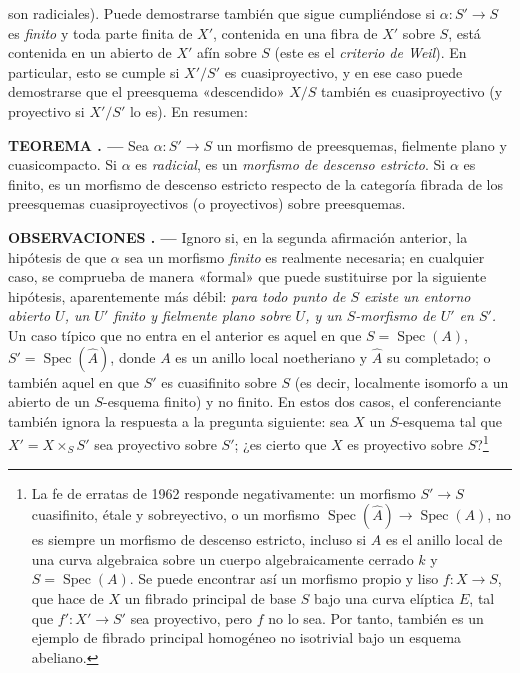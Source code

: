 \documentclass[11pt,twoside,openany]{book}
\numberwithin{equation}{section}
\newcommand{\src}[1]{%
  \phantomsection\hypertarget{src:#1}{}%
  \marginpar{\raggedleft\footnotesize\sffamily #1}%
}
\theoremstyle{plain}
\theoremstyle{definition}
\theoremstyle{remark}
\newcommand{\result}[2]{%
  \par\medskip\noindent\textbf{#1%
  \if\relax\detokenize{#2}\relax\else\space#2\fi. ---}\enspace
}
\newcommand{\FgaUnitKey}{frontmatter}
\renewcommand{\src}[1]{%
  \phantomsection\hypertarget{src:\FgaUnitKey:#1}{}%
  \marginpar{\raggedleft\footnotesize\sffamily #1}%
}
\theoremstyle{plain}
\theoremstyle{definition}
\theoremstyle{remark}
\begin{document}
\src{318}
son radiciales). Puede demostrarse también que sigue cumpliéndose si
$\alpha:S'\longrightarrow S$ es \emph{finito} y toda parte finita de $X'$,
contenida en una fibra de $X'$ sobre $S$, está contenida en un abierto de $X'$
afín sobre $S$ (este es el \emph{criterio de Weil}). En particular, esto se
cumple si $X'/S'$ es cuasiproyectivo, y en ese caso puede demostrarse que el
preesquema «descendido» $X/S$ también es cuasiproyectivo (y proyectivo si
$X'/S'$ lo es). En resumen:

\result{TEOREMA}{3} Sea $\alpha:S'\longrightarrow S$ un morfismo de
preesquemas, fielmente plano y cuasicompacto. Si $\alpha$ es \emph{radicial},
es un \emph{morfismo de descenso estricto}. Si $\alpha$ es finito, es un
morfismo de descenso estricto respecto de la categoría fibrada de los
preesquemas cuasiproyectivos (o proyectivos) sobre preesquemas.

\result{OBSERVACIONES}{} Ignoro si, en la segunda afirmación anterior, la
hipótesis de que $\alpha$ sea un morfismo \emph{finito} es realmente necesaria;
en cualquier caso, se comprueba de manera «formal» que puede sustituirse por la
siguiente hipótesis, aparentemente más débil: \emph{para todo punto de $S$
existe un entorno abierto $U$, un $U'$ finito y fielmente plano sobre $U$, y un
$S$-morfismo de $U'$ en $S'$.} Un caso típico que no entra en el anterior es
aquel en que $S=\operatorname{Spec}(A)$,
$S'=\operatorname{Spec}(\widehat A)$, donde $A$ es un anillo local noetheriano
y $\widehat A$ su completado; o también aquel en que $S'$ es cuasifinito sobre
$S$ (es decir, localmente isomorfo a un abierto de un $S$-esquema finito) y no
finito. En estos dos casos, el conferenciante también ignora la respuesta a la
pregunta siguiente: sea $X$ un $S$-esquema tal que $X'=X\times_SS'$ sea
proyectivo sobre $S'$; ¿es cierto que $X$ es proyectivo sobre
$S$?\footnote{La fe de erratas de 1962 responde negativamente: un morfismo
$S'\longrightarrow S$ cuasifinito, étale y sobreyectivo, o un morfismo
$\operatorname{Spec}(\widehat A)\longrightarrow\operatorname{Spec}(A)$, no es
siempre un morfismo de descenso estricto, incluso si $A$ es el anillo local de
una curva algebraica sobre un cuerpo algebraicamente cerrado $k$ y
$S=\operatorname{Spec}(A)$. Se puede encontrar así un morfismo propio y liso
$f:X\longrightarrow S$, que hace de $X$ un fibrado principal de base $S$ bajo
una curva elíptica $E$, tal que $f':X'\longrightarrow S'$ sea proyectivo, pero
$f$ no lo sea. Por tanto, también es un ejemplo de fibrado principal homogéneo
no isotrivial bajo un esquema abeliano.}
\end{document}
